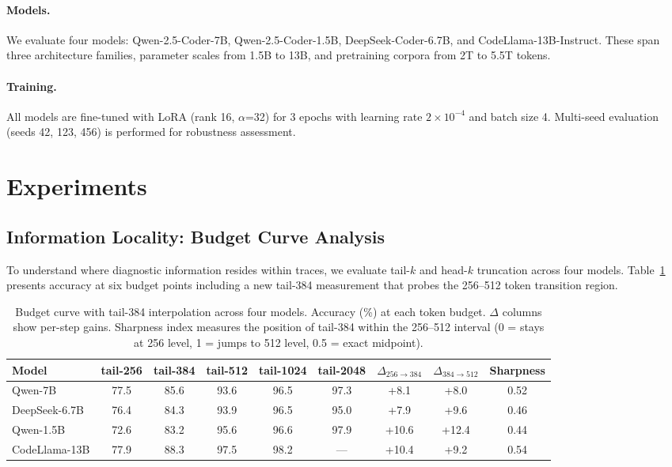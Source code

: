 \documentclass[11pt,a4paper]{article}
\begin{document}
\paragraph{Models.} We evaluate four models: Qwen-2.5-Coder-7B, Qwen-2.5-Coder-1.5B, DeepSeek-Coder-6.7B, and CodeLlama-13B-Instruct. These span three architecture families, parameter scales from 1.5B to 13B, and pretraining corpora from 2T to 5.5T tokens.

\paragraph{Training.} All models are fine-tuned with LoRA (rank 16, $\alpha$=32) for 3 epochs with learning rate $2\times10^{-4}$ and batch size 4. Multi-seed evaluation (seeds 42, 123, 456) is performed for robustness assessment.

\section{Experiments}
\label{sec:exp}

\subsection{Information Locality: Budget Curve Analysis}
\label{sec:budget}

To understand where diagnostic information resides within traces, we evaluate tail-$k$ and head-$k$ truncation across four models. Table~\ref{tab:budget} presents accuracy at six budget points including a new tail-384 measurement that probes the 256--512 token transition region.

\begin{table}[t]
\centering
\caption{Budget curve with tail-384 interpolation across four models. Accuracy (\%) at each token budget. $\Delta$ columns show per-step gains. Sharpness index measures the position of tail-384 within the 256--512 interval (0 = stays at 256 level, 1 = jumps to 512 level, 0.5 = exact midpoint).}
\label{tab:budget}
\small
\begin{tabular}{@{}lcccccccc@{}}
\toprule
Model & tail-256 & tail-384 & tail-512 & tail-1024 & tail-2048 & $\Delta_{256 \to 384}$ & $\Delta_{384 \to 512}$ & Sharpness \\
\midrule
Qwen-7B     & 77.5 & 85.6 & 93.6 & 96.5 & 97.3 & +8.1 & +8.0 & 0.52 \\
DeepSeek-6.7B & 76.4 & 84.3 & 93.9 & 96.5 & 95.0 & +7.9 & +9.6 & 0.46 \\
Qwen-1.5B   & 72.6 & 83.2 & 95.6 & 96.6 & 97.9 & +10.6 & +12.4 & 0.44 \\
CodeLlama-13B & 77.9 & 88.3 & 97.5 & 98.2 & --- & +10.4 & +9.2 & 0.54 \\
\bottomrule
\end{tabular}
\end{table}
\end{document}
